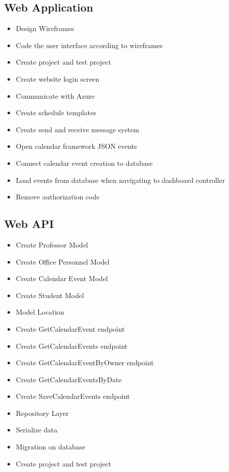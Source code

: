 \documentclass{article}
\begin{document}
{\subsection*{Web Application}
\begin{itemize}
\item Design Wireframes
\item Code the user interface according to wireframes
\item Create project and test project
\item Create website login screen
\item Communicate with Azure
\item Create schedule templates
\item Create send and receive message system
\item Open calendar framework JSON events
\item Connect calendar event creation to database
\item Load events from database when navigating to dashboard controller
\item Remove authorization code
\end{itemize}

\subsection*{Web API}
\begin{itemize}
\item Create Professor Model
\item Create Office Personnel Model
\item Create Calendar Event Model
\item Create Student Model
\item Model Location
\item Create GetCalendarEvent endpoint
\item Create GetCalendarEvents endpoint
\item Create GetCalendarEventByOwner endpoint
\item Create GetCalendarEventsByDate
\item Create SaveCalendarEvents endpoint
\item Repository Layer
\item Serialize data
\item Migration on database
	\item Create project and test project
\end{itemize}

}
\end{document}
